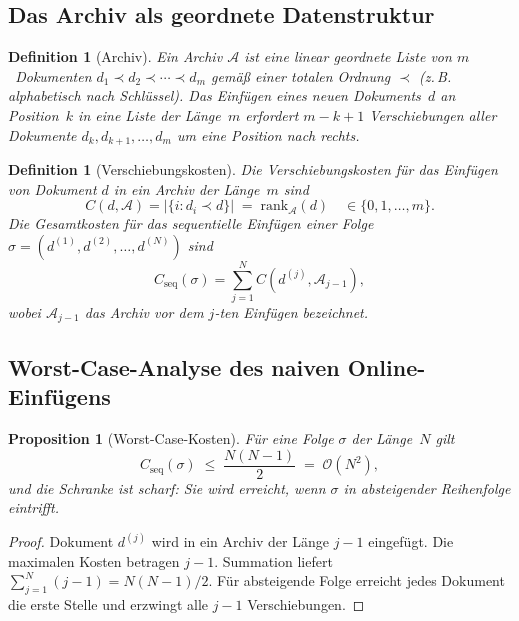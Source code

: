 ﻿\documentclass[12pt, a4paper]{article}
\newtheorem{proposition}[theorem]{Proposition}
\newtheorem{definition}[theorem]{Definition}
\begin{document}
\subsection{Das Archiv als geordnete Datenstruktur}

\begin{definition}[Archiv]\label{def:archive}
Ein \emph{Archiv} $\mathcal{A}$ ist eine linear geordnete Liste von
$m$~Dokumenten $d_1 \prec d_2 \prec \cdots \prec d_m$ gemäß einer totalen
Ordnung $\prec$ (z.\,B. alphabetisch nach Schlüssel). Das \emph{Einfügen}
eines neuen Dokuments~$d$ an Position~$k$ in eine Liste der Länge~$m$
erfordert $m - k + 1$ \emph{Verschiebungen} aller Dokumente $d_k, d_{k+1},
\ldots, d_m$ um eine Position nach rechts.
\end{definition}

\begin{definition}[Verschiebungskosten]\label{def:cost}
Die \emph{Verschiebungskosten} für das Einfügen von Dokument $d$ in ein
Archiv der Länge~$m$ sind
\[
  C(d, \mathcal{A}) = \bigl|\{i : d_i \prec d\}\bigr| \;=\; \mathrm{rank}_{\mathcal{A}}(d)
  \quad\in\{0, 1, \ldots, m\}.
\]
Die Gesamtkosten für das sequentielle Einfügen einer Folge
$\sigma = (d^{(1)}, d^{(2)}, \ldots, d^{(N)})$ sind
\[
  C_{\mathrm{seq}}(\sigma) = \sum_{j=1}^{N} C\!\left(d^{(j)},
  \mathcal{A}_{j-1}\right),
\]
wobei $\mathcal{A}_{j-1}$ das Archiv vor dem $j$-ten Einfügen bezeichnet.
\end{definition}

\subsection{Worst-Case-Analyse des naiven Online-Einfügens}

\begin{proposition}[Worst-Case-Kosten]\label{prop:worstcase}
Für eine Folge $\sigma$ der Länge~$N$ gilt
\[
  C_{\mathrm{seq}}(\sigma) \;\leq\; \frac{N(N-1)}{2} \;=\; \mathcal{O}(N^2),
\]
und die Schranke ist scharf: Sie wird erreicht, wenn $\sigma$ in absteigender
Reihenfolge eintrifft.
\end{proposition}

\begin{proof}
Dokument $d^{(j)}$ wird in ein Archiv der Länge $j-1$ eingefügt. Die maximalen
Kosten betragen $j-1$. Summation liefert
$\sum_{j=1}^{N}(j-1) = N(N-1)/2$. Für absteigende Folge erreicht jedes
Dokument die erste Stelle und erzwingt alle $j-1$ Verschiebungen.
\end{proof}
\end{document}
